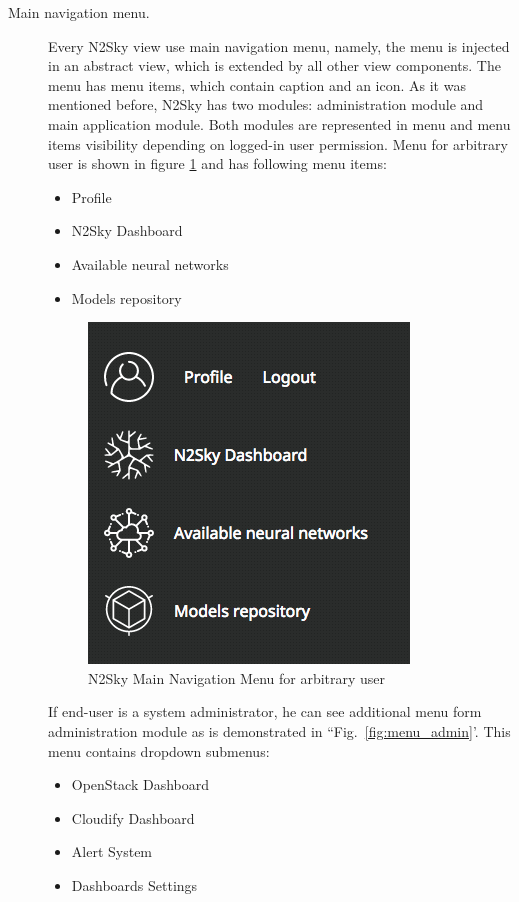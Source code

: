 \begin{description}
\item[Main navigation menu.] Every N2Sky view use main navigation menu, namely, the menu is injected in an abstract view, which is extended by all other view components. The menu has menu items, which contain caption and an icon. As it was mentioned before, N2Sky has two modules: administration module and main application module. Both modules are represented in menu and menu items visibility depending on logged-in user permission. 
Menu for arbitrary user is shown in figure \ref{fig:menu_user}  and has following menu items:

\begin{itemize}
\item Profile 
\item N2Sky Dashboard
\item Available neural networks
\item Models repository
\end{itemize}

 
 \begin{figure}[htbp]
\begin{center}
  \includegraphics[scale=0.65]{components/3/components/menu_user.png}
  \caption{N2Sky Main Navigation Menu for arbitrary user}
  \label{fig:menu_user}
\end{center}
\end{figure}

If end-user is a system administrator, he can see additional menu form administration module as is demonstrated in ``Fig.~\ref{fig:menu_admin}'. This menu contains dropdown submenus: 

\begin{itemize}
\item OpenStack Dashboard
\item Cloudify Dashboard
\item Alert System
\item Dashboards Settings
\end{itemize}



\end{description}

